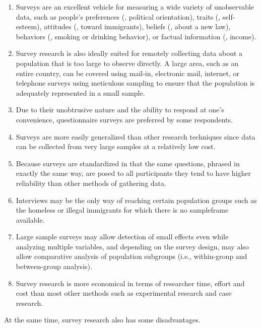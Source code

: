 \begin{enumerate}
	\item Surveys are an excellent vehicle for measuring a wide variety of unobservable data, such as people's preferences (\eg, political orientation), traits (\eg, self-esteem), attitudes (\eg, toward immigrants), beliefs (\eg, about a new law), behaviors (\eg, smoking or drinking behavior), or factual information (\eg, income). 

	\item Survey research is also ideally suited for remotely collecting data about a population that is too large to observe directly. A large area, such as an entire country, can be covered using mail-in, electronic mail, internet, or telephone surveys using meticulous sampling to ensure that the population is adequately represented in a small sample. 

	\item Due to their unobtrusive nature and the ability to respond at one's convenience, questionnaire surveys are preferred by some respondents.

	\item Surveys are more easily generalized than other research techniques since data can be collected from very large samples at a relatively low cost.

	\item Because surveys are standardized in that the same questions, phrased in exactly the same way, are posed to all participants they tend to have higher \gls{reliability} than other methods of gathering data.

	\item Interviews may be the only way of reaching certain population groups such as the homeless or illegal immigrants for which there is no \gls{sampleframe} available. 

	\item Large sample surveys may allow detection of small effects even while analyzing multiple variables, and depending on the survey design, may also allow comparative analysis of population subgroups (i.e., within-group and between-group analysis). 

	\item Survey research is more economical in terms of researcher time, effort and cost than most other methods such as experimental research and case research.
\end{enumerate}

At the same time, survey research also has some disadvantages. 

